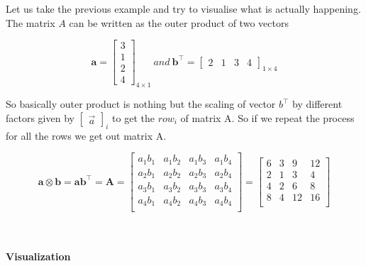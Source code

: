 \documentclass{article}
\begin{document}
Let us take the previous example and try to visualise what is actually happening. \\
The matrix $A$ can be written as the outer product of two vectors

$$
\mathbf{a} = {
\begin{bmatrix}
    3 \\
    1 \\
    2 \\
    4
\end{bmatrix}_{4 \times 1}
} \ and \
\mathbf{b^{\top}} = {
\begin{bmatrix}
    2 & 1 & 3 & 4
\end{bmatrix}_{1 \times 4}
}
$$

So basically outer product is nothing but the scaling of vector $b^{\top}$ by different factors given by $\begin{bmatrix}
    \vec{a}
\end{bmatrix}_{i}$ to get the $row_{i}$ of matrix A. So if we repeat the process for all the rows we get out matrix A.

$$
{\displaystyle 
    \mathbf {a} \otimes \mathbf {b} =\mathbf{a}\mathbf{b^{\top}} =\mathbf {A} =
    {\begin{bmatrix} 
        a_{1}b_{1} & a_{1}b_{2} & a_{1}b_{3} & a_{1}b_{4} \\ 
        a_{2}b_{1} & a_{2}b_{2} & a_{2}b_{3} & a_{2}b_{4} \\
        a_{3}b_{1} & a_{3}b_{2} & a_{3}b_{3} & a_{3}b_{4} \\
        a_{4}b_{1} & a_{4}b_{2} & a_{4}b_{3} & a_{4}b_{4} \\
    \end{bmatrix}} = 
    {\begin{bmatrix} 
        6 & 3 & 9 & 12 \\
        2 & 1 & 3 & 4 \\
        4 & 2 & 6 & 8 \\
        8 & 4 & 12 & 16 \\
    \end{bmatrix}}
}
$$ 
\\ \\
\begin{center}
    \textbf{\large Visualization}
\end{center} 

\vspace{1cm}
\end{document}

